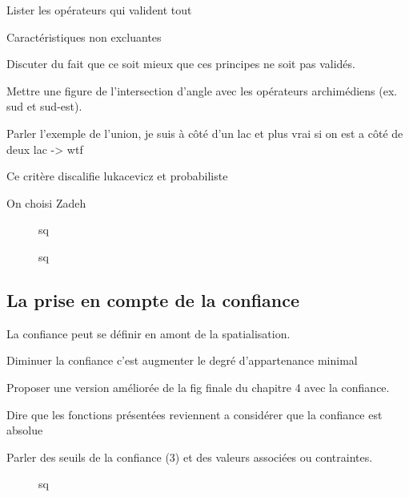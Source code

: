 Lister les opérateurs qui valident tout

Caractéristiques non excluantes

Discuter du fait que ce soit mieux que ces principes ne soit pas
validés.


Mettre une figure de l'intersection d'angle avec les opérateurs
archimédiens (ex. sud et sud-est).

Parler l'exemple de l'union, je suis à côté d'un lac et plus vrai si
on est a côté de deux lac -> wtf

Ce critère discalifie lukacevicz et probabiliste


On choisi Zadeh

\begin{figure}
  \centering
  
  \caption{sq}
\end{figure}

\begin{figure}
  \centering
  
  \caption{sq}
\end{figure}



\subsection{La prise en compte de la confiance}

La confiance peut se définir en amont de la spatialisation.

Diminuer la confiance c'est augmenter le degré d'appartenance minimal

Proposer une version améliorée de la fig finale du chapitre 4 avec la
confiance.

Dire que les fonctions présentées reviennent a considérer que la
confiance est absolue

Parler des seuils de la confiance (3) et des valeurs associées ou
contraintes.


\begin{figure}
  \centering
  
  \caption{sq}
  \label{fig:qs}
\end{figure}





